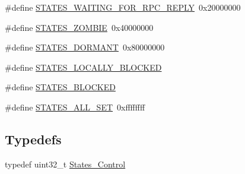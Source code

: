 \begin{DoxyCompactItemize}
\item 
\#define \mbox{\hyperlink{group__RTEMSScoreStates_ga7d5dc260caffe21979575dbbf67dccfa}{S\+T\+A\+T\+E\+S\+\_\+\+W\+A\+I\+T\+I\+N\+G\+\_\+\+F\+O\+R\+\_\+\+R\+P\+C\+\_\+\+R\+E\+P\+LY}}~0x20000000
\item 
\#define \mbox{\hyperlink{group__RTEMSScoreStates_ga9bf0f53422c075e223e8359f863cbae5}{S\+T\+A\+T\+E\+S\+\_\+\+Z\+O\+M\+B\+IE}}~0x40000000
\item 
\#define \mbox{\hyperlink{group__RTEMSScoreStates_gaafb38b1224506b1bf5d74567918b067a}{S\+T\+A\+T\+E\+S\+\_\+\+D\+O\+R\+M\+A\+NT}}~0x80000000
\item 
\#define \mbox{\hyperlink{group__RTEMSScoreStates_ga59b073cb234436307fa512eaa056c304}{S\+T\+A\+T\+E\+S\+\_\+\+L\+O\+C\+A\+L\+L\+Y\+\_\+\+B\+L\+O\+C\+K\+ED}}
\item 
\#define \mbox{\hyperlink{group__RTEMSScoreStates_ga4c56903aab84fbc8e63ef439873ccf1d}{S\+T\+A\+T\+E\+S\+\_\+\+B\+L\+O\+C\+K\+ED}}
\item 
\#define \mbox{\hyperlink{group__RTEMSScoreStates_gacd3ccb34703785a9d4b26f37df708494}{S\+T\+A\+T\+E\+S\+\_\+\+A\+L\+L\+\_\+\+S\+ET}}~0xffffffff
\end{DoxyCompactItemize}
\subsection*{Typedefs}
\begin{DoxyCompactItemize}
\item 
typedef uint32\+\_\+t \mbox{\hyperlink{group__RTEMSScoreStates_gaeebbea0bfca162709b124fd519cf99d3}{States\+\_\+\+Control}}
\end{DoxyCompactItemize}
